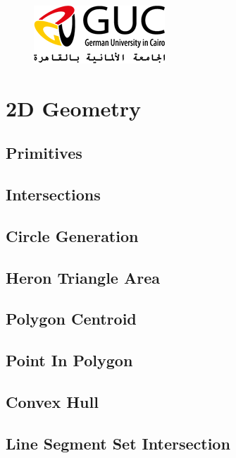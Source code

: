 \documentclass[twocolumn]{article}
\begin{document}
	\begin{figure}
		\begin{center}
			\includegraphics{guc_logo}
		\end{center}
	\end{figure}

	\tableofcontents

	\newpage

	\section{2D Geometry}
		\subsection{Primitives}
			
		\subsection{Intersections}
			
		\subsection{Circle Generation}
			
		\subsection{Heron Triangle Area}
			
		\subsection{Polygon Centroid}
			
		\subsection{Point In Polygon}
			
		\subsection{Convex Hull}
			
		\subsection{Line Segment Set Intersection}
			
\end{document}
